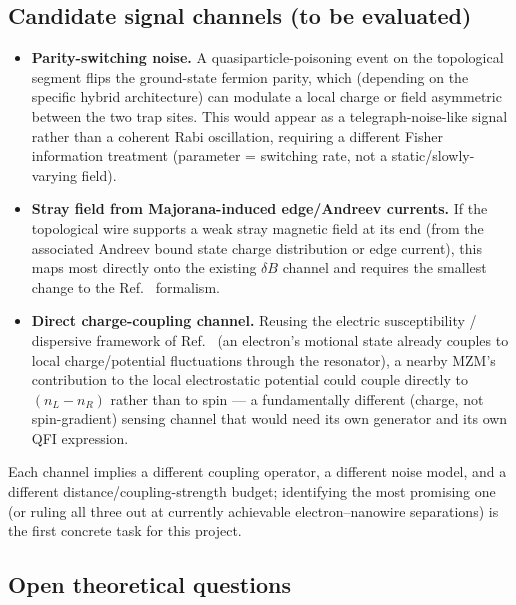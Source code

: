 \documentclass[aps,pra,reprint,superscriptaddress,longbibliography]{revtex4-2}
\begin{document}
\subsection{Candidate signal channels (to be evaluated)}

\begin{itemize}
  \item \textbf{Parity-switching noise.} A quasiparticle-poisoning event on the topological segment
  flips the ground-state fermion parity, which (depending on the specific hybrid architecture) can
  modulate a local charge or field asymmetric between the two trap sites. This would appear as a
  telegraph-noise-like signal rather than a coherent Rabi oscillation, requiring a different Fisher
  information treatment (parameter = switching rate, not a static/slowly-varying field).
  \item \textbf{Stray field from Majorana-induced edge/Andreev currents.} If the topological wire
  supports a weak stray magnetic field at its end (from the associated Andreev bound state charge
  distribution or edge current), this maps most directly onto the existing $\delta B$ channel and
  requires the smallest change to the Ref.~\cite{perruzza2026} formalism.
  \item \textbf{Direct charge-coupling channel.} Reusing the electric susceptibility / dispersive
  framework of Ref.~\cite{castoria2025} (an electron's motional state already couples to local
  charge/potential fluctuations through the resonator), a nearby MZM's contribution to the local
  electrostatic potential could couple directly to $(n_L - n_R)$ rather than to spin — a fundamentally
  different (charge, not spin-gradient) sensing channel that would need its own generator and its own
  QFI expression.
\end{itemize}

Each channel implies a different coupling operator, a different noise model, and a different
distance/coupling-strength budget; identifying the most promising one (or ruling all three out at
currently achievable electron--nanowire separations) is the first concrete task for this project.

\subsection{Open theoretical questions}
\end{document}

